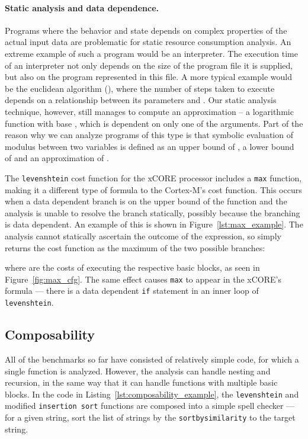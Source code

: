 \documentclass[9pt,preprint]{sigplanconf}
\newcommand{\figref}[1]{Figure~\ref{fig:#1}}
\begin{document}
\paragraph{Static analysis and data dependence.}
Programs where the behavior and state depends on complex properties of the
actual input data are problematic for static resource consumption
analysis. An extreme example of such a program would be an
interpreter. The execution time of an interpreter not only depends on the size
of the program file it is supplied, but also on the program represented in this
file. A more typical example would be the euclidean algorithm (),
where the number of 
steps taken to execute depends on a relationship between its parameters
 and . Our static analysis technique, however, still manages to compute an
approximation -- a logarithmic function with base , which is dependent on
only one of the arguments. Part of the reason why we can analyze programs of
this type is that symbolic evaluation of modulus between two variables
 is defined as an upper bound of , a lower bound of  and an
approximation of .

The \texttt{levenshtein} cost function for the xCORE processor includes a
\texttt{max} function, making it a different type of formula to the Cortex-M's
cost function. This occurs when a data dependent branch is on the upper bound of
the function and the analysis is unable to resolve the branch statically,
possibly because the branching is data dependent. An example of this is shown in
Figure~\ref{lst:max_example}. The analysis cannot statically ascertain the
outcome of the  expression, so simply returns the cost function as the
maximum of the two possible branches:

where  are the costs of executing the respective basic blocks, as
seen in \figref{max_cfg}. The same effect causes
\texttt{max} to appear in the xCORE's formula --- there is a data dependent
\texttt{if} statement in an inner loop of \texttt{levenshtein}.

\subsection{Composability}
All of the benchmarks so far have consisted of relatively simple code, for which
a single function is analyzed. However, the analysis can handle nesting and
recursion, in the same way that it can handle functions with multiple basic
blocks. In the code in Listing~\ref{lst:composability_example}, the
\texttt{levenshtein} and modified \texttt{insertion sort} functions are composed into a
simple spell checker --- for a given string, sort
the list of strings by the \texttt{sortbysimilarity} to the target string.
\end{document}

